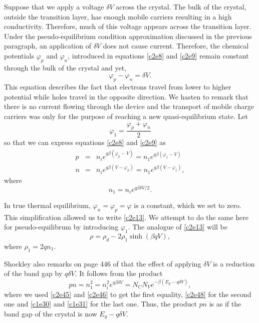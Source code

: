 Suppose that we apply a voltage $\delta V$ across the crystal. The bulk of the
crystal, outside the transition layer, has enough mobile carriers resulting in
a high conductivity. Therefore, much of this voltage appears across the 
transition layer. Under the pseudo-equilibrium condition approximation discussed
in the previous paragraph, an application of $\delta V$ does not cause current.
Therefore, the chemical potentials $\varphi_p$ and $\varphi_n$, introduced in
equations \eqref{c2e8} and \eqref{c2e9} remain constant through the bulk of 
the crystal and yet,
\begin{equation}\label{c2e43}
\varphi_p - \varphi_n = \delta V.
\end{equation}
This equation describes the fact that electrons travel from lower to higher
potential while holes travel in the opposite direction. We hasten to remark that
there is no current flowing through the device and the transport of mobile
charge carriers was only for the purpose of reaching a new quasi-equilibrium
state. Let 
\begin{equation}\label{c2e44}
\varphi_1 = \frac{\varphi_p + \varphi_n}{2}
\end{equation}
so that we can express equations \eqref{c2e8} and \eqref{c2e9} as
\begin{eqnarray}
p &=& n_i e^{q\beta(\varphi_p - V)} = 
    n_1e^{q\beta(\varphi_1 - V)}  \label{c2e45} \\
n &=& n_i e^{q\beta(V - \varphi_n)} = 
    n_1e^{q\beta(V - \varphi_1)}, \label{c2e46}
\end{eqnarray}
where
\begin{equation}\label{c2e47}
n_1 = n_i e^{q\beta\delta V/2}.
\end{equation}

In true thermal equilibrium, $\varphi_n = \varphi_p = \varphi$ is a constant,
which we set to zero. This simplification allowed us to write \eqref{c2e13}. We
attempt to do the same here for pseudo-equilibrum by introducing $\varphi_1$. 
The analogue of \eqref{c2e13} will be
\begin{equation}\label{c2e48}
\rho = \rho_d - 2\rho_1\sinh(\beta qV),
\end{equation}
where $\rho_1 = 2qn_1$.


Shockley also remarks on page 446 of \cite{shockley1949theory} that the effect
of applying $\delta V$ is a reduction of the band gap by $q\delta V$. It 
follows from the product 
\begin{equation}\label{c2e49}
pn = n_1^2 = n_i^2 e^{q\beta\delta V} = N_CN_Ve^{-\beta (E_g - q\delta V)},
\end{equation}
where we used \eqref{c2e45} and \eqref{c2e46} to get the first equality,
\eqref{c2e48} for the second one and \eqref{c1e30} and \eqref{c1e31} for the
last one. Thus, the product $pn$ is as if the band gap of the crystal is now
$E_g - q\delta V$.

